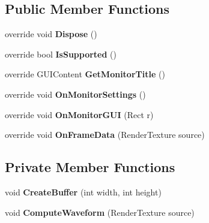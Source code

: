 \subsection*{Public Member Functions}
\begin{DoxyCompactItemize}
\item 
\mbox{\label{class_unity_editor_1_1_post_processing_1_1_parade_monitor_a44b7cab29094f27567876326ed95532b}} 
override void {\bfseries Dispose} ()
\item 
\mbox{\label{class_unity_editor_1_1_post_processing_1_1_parade_monitor_a2dd290573b4cffc742c71023f6cf8e96}} 
override bool {\bfseries Is\+Supported} ()
\item 
\mbox{\label{class_unity_editor_1_1_post_processing_1_1_parade_monitor_a6cc2ec9d06d49a5449f5bff20e43d27d}} 
override G\+U\+I\+Content {\bfseries Get\+Monitor\+Title} ()
\item 
\mbox{\label{class_unity_editor_1_1_post_processing_1_1_parade_monitor_acd49021b355e14e3fe60feefe350a504}} 
override void {\bfseries On\+Monitor\+Settings} ()
\item 
\mbox{\label{class_unity_editor_1_1_post_processing_1_1_parade_monitor_add0c2d3325871b1df9e4e49302f0a426}} 
override void {\bfseries On\+Monitor\+G\+UI} (Rect r)
\item 
\mbox{\label{class_unity_editor_1_1_post_processing_1_1_parade_monitor_a8e49f6f541ec218ac719b87773deaae6}} 
override void {\bfseries On\+Frame\+Data} (Render\+Texture source)
\end{DoxyCompactItemize}
\subsection*{Private Member Functions}
\begin{DoxyCompactItemize}
\item 
\mbox{\label{class_unity_editor_1_1_post_processing_1_1_parade_monitor_a944b162fd302b994b57b543c3a074032}} 
void {\bfseries Create\+Buffer} (int width, int height)
\item 
\mbox{\label{class_unity_editor_1_1_post_processing_1_1_parade_monitor_a1f4259106444355818aa996fc249523c}} 
void {\bfseries Compute\+Waveform} (Render\+Texture source)
\end{DoxyCompactItemize}
